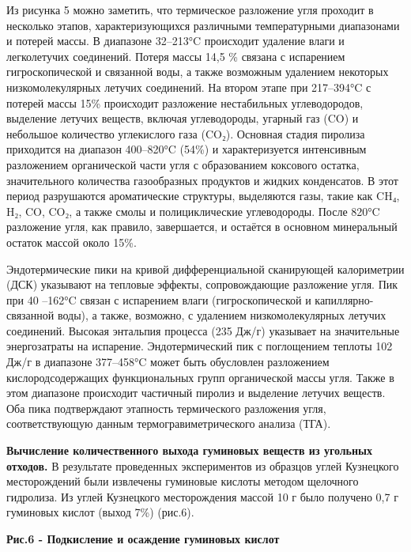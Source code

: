\begin{multicols}{2}
Из рисунка 5 можно заметить, что термическое разложение угля проходит в
несколько этапов, характеризующихся различными температурными
диапазонами и потерей массы. В диапазоне 32--213°C происходит удаление
влаги и легколетучих соединений. Потеря массы 14,5 \% связана с
испарением гигроскопической и связанной воды, а также возможным
удалением некоторых низкомолекулярных летучих соединений. На втором
этапе при 217--394°C с потерей массы 15\% происходит разложение
нестабильных углеводородов, выделение летучих веществ, включая
углеводороды, угарный газ (CO) и небольшое количество углекислого газа
(CO₂). Основная стадия пиролиза приходится на диапазон 400--820°C (54\%)
и характеризуется интенсивным разложением органической части угля с
образованием коксового остатка, значительного количества газообразных
продуктов и жидких конденсатов. В этот период разрушаются ароматические
структуры, выделяются газы, такие как CH₄, H₂, CO, CO₂, а также смолы и
полициклические углеводороды. После 820°C разложение угля, как правило,
завершается, и остаётся в основном минеральный остаток массой около
15\%.

Эндотермические пики на кривой дифференциальной сканирующей калориметрии
(ДСК) указывают на тепловые эффекты, сопровождающие разложение угля. Пик
при 40 --162°C связан с испарением влаги (гигроскопической и
капиллярно-связанной воды), а также, возможно, с удалением
низкомолекулярных летучих соединений. Высокая энтальпия процесса (235
Дж/г) указывает на значительные энергозатраты на испарение.
Эндотермический пик с поглощением теплоты 102 Дж/г в диапазоне
377--458°C может быть обусловлен разложением кислородсодержащих
функциональных групп органической массы угля. Также в этом диапазоне
происходит частичный пиролиз и выделение летучих веществ. Оба пика
подтверждают этапность термического разложения угля, соответствующую
данным термогравиметрического анализа (ТГА).

{\bfseries Вычисление количественного выхода гуминовых веществ из угольных
отходов.} В результате проведенных экспериментов из образцов углей
Кузнецкого месторождений были извлечены гуминовые кислоты методом
щелочного гидролиза. Из углей Кузнецкого месторождения массой 10 г было
получено 0,7 г гуминовых кислот (выход 7\%) (рис.6).
\end{multicols}

{\bfseries Рис.6 - Подкисление и осаждение гуминовых кислот}

